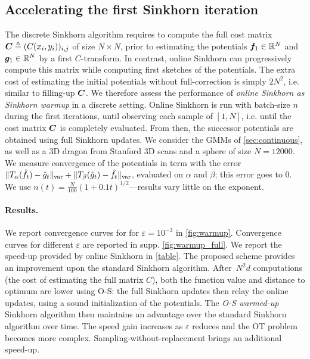 \subsection{Accelerating the first Sinkhorn iteration}\label{sec:accelerating}

The discrete Sinkhorn algorithm requires to compute the full cost matrix $\bm{C}
\triangleq (C(x_i,y_i))_{i,j}$  of size $N \times N$, prior to estimating the
potentials $\bm{f}_1 \in \mathbb{R}^N$ and $\bm{g}_1 \in \mathbb{R}^N$ by a first $C$-transform. In
contrast, online Sinkhorn can progressively compute this matrix while computing
first sketches of the potentials. The extra cost of estimating the initial potentials
without full-correction is simply $2 N^2$, i.e. similar to filling-up $\bm{C}$. We
therefore assess the performance of \textit{online Sinkhorn as Sinkhorn warmup}
in a discrete setting. Online Sinkhorn is run with batch-size $n$ during the
first iterations, until observing each sample of $[1,N]$, i.e. until the cost
matrix $\bm{C}$ is completely evaluated. From then, the
successor potentials are obtained using full Sinkhorn updates. We consider the
GMMs of \autoref{sec:continuous}, as well as a 3D dragon from Stanford 3D scans
\cite{turk1994zippered} and a sphere of size $N=12000$. We measure
convergence of the potentials in term with the error $\Vert
T_{\alpha}(\hat f_t) - \hat g_t \Vert_{\text{\upshape var}} + \Vert T_{\beta}(\hat
g_t) - \hat f_t \Vert_{\text{\upshape var}}$, evaluated on $\alpha$ and $\beta$; this error
goes to $0$. We use $n(t) = \frac{N}{100} (1+0.1t)^{1/2}$---results vary little on the exponent.


\paragraph{Results.} We report convergence curves for for $\varepsilon =
10^{-3}$ in \autoref{fig:warmup}. Convergence curves for different
$\varepsilon$ are reported in supp. \autoref{fig:warmup_full}. We report the speed-up
provided by online Sinkhorn in \autoref{table}. The proposed scheme provides an
improvement upon the standard Sinkhorn algorithm. After $N^2 d$ computations
(the cost of estimating the full matrix $C$), both the function value and
distance to optimum are lower using O-S: the full Sinkhorn updates then
relay the online updates, using a sound initialization of the potentials. The
\textit{O-S warmed-up} Sinkhorn algorithm then maintains an advantage over the
standard Sinkhorn algorithm over time. The speed gain increases
as $\varepsilon$ reduces and the OT problem becomes more complex. Sampling-without-replacement brings an additional speed-up.
